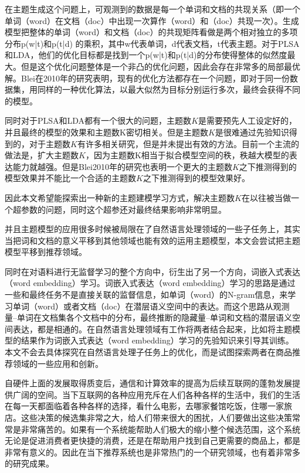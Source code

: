 在主题生成这个问题上，可观测到的数据是每一个单词和文档的共现关系（即一个单词（word）在文档（doc）中出现一次算作（word）和（doc）共现一次）。生成模型把整体的单词（word）和文档（doc）的共现矩阵看做是两个相对独立的多项分布p(w|t)和p(t|d) 的乘积，其中w代表单词，d代表文档，t代表主题。对于PLSA和LDA，他们的优化目标都是找到一个p(w|t)和p(t|d)的分布使得整体的似然度最大。但是这个优化问题整体是一个非凸的优化问题，因此会存在非常多的局部最优解。Blei在2010年的研究表明，现有的优化方法都存在一个问题，即对于同一份数据集，用同样的一种优化算法，以最大似然为目标分别运行多次，最终会获得不同的模型。

同时对于PLSA和LDA都有一个很大的问题，主题数$K$是需要预先人工设定好的，并且最终的模型的效果和主题数K密切相关。但是主题数$K$是很难通过先验知识得到的，对于主题数$K$有许多相关研究，但是并未提出有效的方法。目前一个主流的做法是，扩大主题数$K$，因为主题数K相当于拟合模型空间的秩，秩越大模型的表达能力就越强。但是Blei2010年的研究也表明一个更大的主题数$K$之下推测得到的模型效果并不能比一个合适的主题数$K$之下推测得到的模型效果好。

因此本文希望能探索出一种新的主题建模学习方式，解决主题数$K$在以往被当做一个超参数的问题，同时这个超参还对最终结果影响非常明显。

并且主题模型的应用很多时候被局限在了自然语言处理领域的一些子任务上，其实当把词和文档的意义平移到其他领域也能有效的运用主题模型，本文会尝试把主题模型平移到推荐领域。

同时在对语料进行无监督学习的整个方向中，衍生出了另一个方向，词嵌入式表达（word embedding）学习。词嵌入式表达\cite{word2vec,wordemb1,wordemb2,wordemb3}（word embedding）学习的思路是通过一些和最终任务不是直接关联的监督信息，如单词（word）的N-gram\cite{BRODER19971157}信息，来学习单词（word）或者文档（doc）在潜层语义空间中的表达。而这个思路从观测量--单词在文档集各个文档中的分布，最终推断的隐藏量--单词和文档的潜层语义空间表达，都是相通的。在自然语言处理领域有工作将两者结合起来，比如将主题模型的结果作为词嵌入式表达（word embedding）学习的先验知识来引导其训练。本文不会去具体探究在自然语言处理子任务上的优化，而是试图探索两者在商品推荐领域的一些应用和创新。

自硬件上面的发展取得质变后，通信和计算效率的提高为后续互联网的蓬勃发展提供广阔的空间。当下互联网的各种应用充斥在人们各种各样的生活中，我们的生活在每一天都面临着各种各样的选择，看什么电影，去哪家餐馆吃饭，住哪一家旅店。这些决策的候选集非常之大，给人们带来很大的困扰，人们要做出这些决策常常是非常痛苦的。如果有一个系统能帮助人们极大的缩小整个候选范围，这个系统无论是促进消费者更快捷的消费，还是在帮助用户找到自己更需要的商品上，都是非常有意义的。因此在当下推荐系统也是非常热门的一个研究领域，也有着非常多的研究成果。

